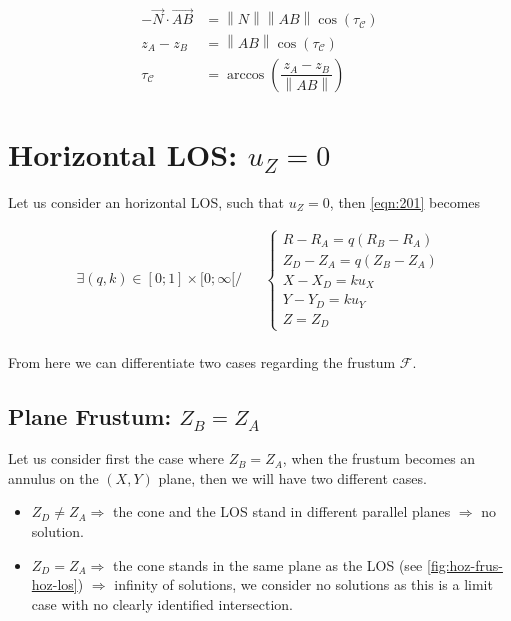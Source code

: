 \documentclass[a4paper,11pt,twoside,titlepage,openright]{book}
\numberwithin{equation}{section}
\newcommand{\norm}[1]{\left\lVert#1\right\rVert}
\begin{document}
\begin{align*}
-\vec{N}\cdot\vec{AB} & = \norm{N} \norm{AB} \cos(\tau_\mathcal{C})\\
z_A - z_B &= \norm{AB} \cos(\tau_\mathcal{C})\\
\tau_\mathcal{C} &= \arccos\left(\dfrac{z_A - z_B}{\norm{AB}}\right)
\end{align*}

\section{Horizontal LOS: $u_Z=0$}

Let us consider an horizontal LOS, such that $u_Z=0$, then \eqref{eqn:201} becomes

$$
\begin{array}{lll}
\exists (q,k) \in [0;1]\times [0;\infty[ /& &
\left\{\begin{array}{ll}
R-R_A = q(R_B-R_A)\\
Z_D-Z_A = q(Z_B-Z_A)\\
X-X_D = ku_X\\
Y-Y_D = ku_Y\\
Z=Z_D
\end{array}\right.\\
\end{array}
$$

From here we can differentiate two cases regarding the frustum $\mathcal{F}$.


\subsection{Plane Frustum: $Z_B = Z_A$}




Let us consider first the case where $Z_B=Z_A$, when the frustum becomes an annulus on the $(X,Y)$ plane, then we will have two different cases.

\begin{itemize}
\item $Z_D\neq Z_A \Rightarrow$ the cone and the LOS stand in different parallel planes $\Rightarrow$ no solution.
\item $Z_D=Z_A \Rightarrow$ the cone stands in the same plane as the LOS (see \ref{fig:hoz-frus-hoz-los}) $\Rightarrow$ infinity of solutions, we consider no solutions as this is a limit case with no clearly identified intersection.
\end{itemize}

\begin{figure}[h]
\end{figure}
\end{document}
